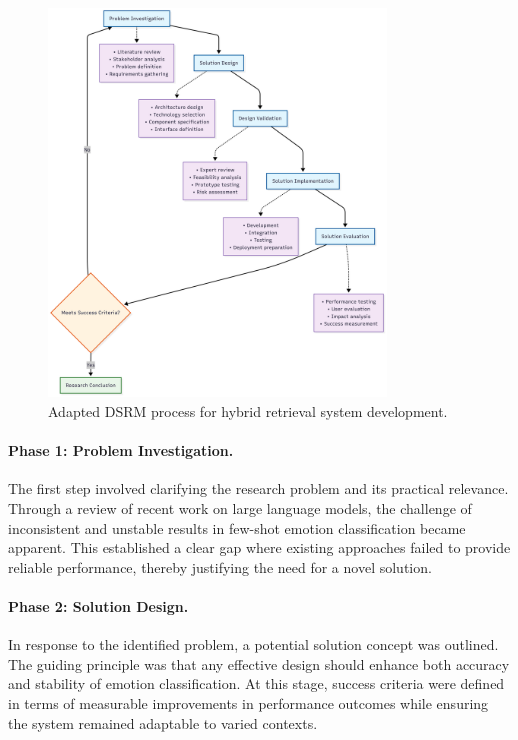 \begin{figure}[H]
    \centering
    \includegraphics[width=0.8\textwidth]{Images/DSRcycle.PNG}
    \caption{Adapted DSRM process for hybrid retrieval system development.}
    \label{fig:dsrm_process}
\end{figure}


\newpage

\paragraph{Phase 1: Problem Investigation.}
The first step involved clarifying the research problem and its practical relevance. Through a review of recent work on large language models, the challenge of inconsistent and unstable results in few-shot emotion classification became apparent. This established a clear gap where existing approaches failed to provide reliable performance, thereby justifying the need for a novel solution.

\paragraph{Phase 2: Solution Design.}
In response to the identified problem, a potential solution concept was outlined. The guiding principle was that any effective design should enhance both accuracy and stability of emotion classification. At this stage, success criteria were defined in terms of measurable improvements in performance outcomes while ensuring the system remained adaptable to varied contexts.

